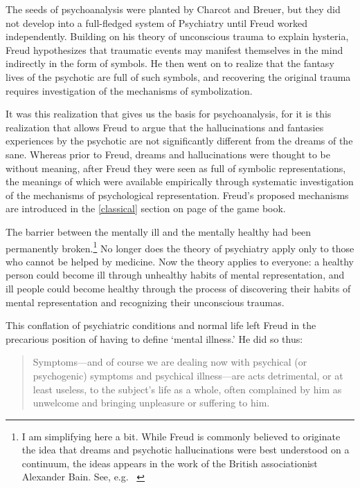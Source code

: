 \begin{refsection}
The seeds of psychoanalysis were planted by Charcot and Breuer, but they did not develop into a full-fledged system of Psychiatry until Freud worked independently. Building on his theory of unconscious trauma to explain hysteria, Freud hypothesizes that traumatic events may manifest themselves in the mind indirectly in the form of symbols. He then went on to realize that the fantasy lives of the psychotic are full of such symbols, and recovering the original trauma requires investigation of the mechanisms of symbolization.

It was this realization that gives us the basis for psychoanalysis, for it is this realization that allows Freud to argue that the hallucinations and fantasies experiences by the psychotic are not significantly different from the dreams of the sane. Whereas prior to Freud, dreams and hallucinations were thought to be without meaning, after Freud they were seen as full of symbolic representations, the meanings of which were available empirically through systematic investigation of the mechanisms of psychological representation. Freud's proposed mechanisms are introduced in the \ref{classical} section on page \pageref{classical} of the game book.

The barrier between the mentally ill and the mentally healthy had been permanently broken.\footnote{I am simplifying here a bit. While Freud is commonly believed to originate the idea that dreams and psychotic hallucinations were best understood on a continuum, the ideas appears in the work of the British associationist Alexander Bain. See, e.g. ~\citep[p. 45]{Bain:1903tf}} No longer does the theory of psychiatry apply only to those who cannot be helped by medicine. Now the theory applies to everyone: a healthy person could become ill through unhealthy habits of mental representation, and ill people could become healthy through the process of discovering their habits of mental representation and recognizing their unconscious traumas. 

This conflation of psychiatric conditions and normal life left Freud in the precarious position of having to define `mental illness.' He did so thus:
\begin{apatextbox}

\begin{quote}

Symptoms---and of course we are dealing now with psychical (or psychogenic) symptoms and psychical illness---are acts detrimental, or at least useless, to the subject's life as a whole, often complained by him as unwelcome and bringing unpleasure or suffering to him. ~\citep[p. 445]{Freud:QdOvAgyZ}
\end{quote}


\end{apatextbox}
\end{refsection}
